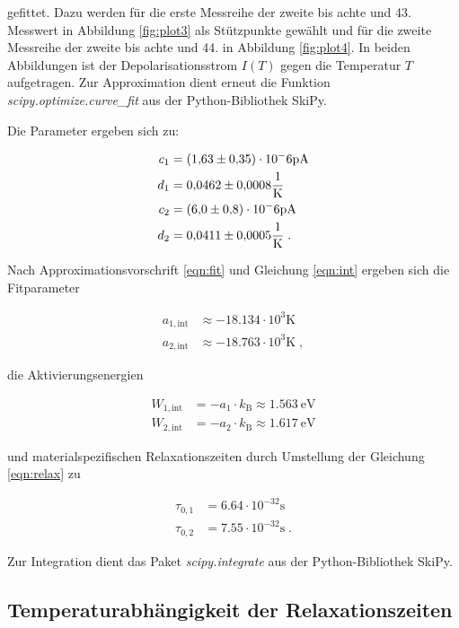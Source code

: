 gefittet. Dazu werden für die erste Messreihe der zweite bis achte und 43. Messwert in Abbildung \ref{fig:plot3} als Stützpunkte gewählt 
und für die zweite Messreihe der zweite bis achte und 44. in Abbildung \ref{fig:plot4}.
In beiden Abbildungen ist der Depolarisationsstrom $I(T)$ gegen die Temperatur $T$ aufgetragen.
Zur Approximation dient erneut die Funktion \textit{scipy.optimize.curve\_fit} aus der Python-Bibliothek SkiPy.

Die Parameter ergeben sich zu:

\begin{align*}
  c_1 &= (\num{1.63 +- 0.35})\cdot 10^-6 \si{\pico\ampere} \\
  d_1 &= \num{0.0462 +- 0.0008} \si{\per\kelvin}\\
  c_2 &= (\num{6.0 +- 0.8})\cdot 10^-6 \si{\pico\ampere}\\
  d_2 &= \num{0.0411 +- 0.0005} \si{\per\kelvin}\; .
\end{align*}

Nach Approximationsvorschrift \eqref{eqn:fit} und Gleichung \eqref{eqn:int} ergeben sich die
Fitparameter 

\begin{align*}
  a_{1,\text{int}} &\approx \num{-18.134} \cdot 10^3 \si{\kelvin} \\
  a_{2,\text{int}} &\approx \num{-18.763} \cdot 10^3 \si{\kelvin}  \; ,
\end{align*}

die Aktivierungsenergien

\begin{align*}
  W_{1,\text{int}} &= -a_1 \cdot k_\text{B} \approx \SI{1.563}{\eV} \\
  W_{2,\text{int}} &= -a_2 \cdot k_\text{B} \approx \SI{1.617}{\eV}
\end{align*}

und materialspezifischen Relaxationszeiten durch Umstellung der Gleichung \eqref{eqn:relax} zu

\begin{align*}
  \tau_{0,1} &= \num{6.64} \cdot 10^{-32} \si{\second}\\
  \tau_{0,2} &= \num{7.55} \cdot 10^{-32} \si{\second} \; .
\end{align*}

Zur Integration dient das Paket \textit{scipy.integrate} aus der Python-Bibliothek SkiPy.

\subsection{Temperaturabhängigkeit der Relaxationszeiten }



